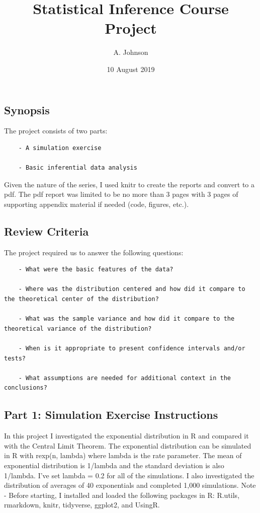 \documentclass[]{article}
\title{Statistical Inference Course Project}
\author{A. Johnson}
\date{10 August 2019}
\begin{document}
\maketitle

\subsection{Synopsis}\label{synopsis}

The project consists of two parts:

\begin{verbatim}
    - A simulation exercise
    
    - Basic inferential data analysis
\end{verbatim}

Given the nature of the series, I used knitr to create the reports and
convert to a pdf. The pdf report was limited to be no more than 3 pages
with 3 pages of supporting appendix material if needed (code, figures,
etc.).

\subsection{Review Criteria}\label{review-criteria}

The project required us to answer the following questions:

\begin{verbatim}
    - What were the basic features of the data? 
    
    - Where was the distribution centered and how did it compare to the theoretical center of the distribution?
    
    - What was the sample variance and how did it compare to the theoretical variance of the distribution?
    
    - When is it appropriate to present confidence intervals and/or tests? 
    
    - What assumptions are needed for additional context in the conclusions? 
\end{verbatim}

\subsection{Part 1: Simulation Exercise
Instructions}\label{part-1-simulation-exercise-instructions}

In this project I investigated the exponential distribution in R and
compared it with the Central Limit Theorem. The exponential distribution
can be simulated in R with rexp(n, lambda) where lambda is the rate
parameter. The mean of exponential distribution is 1/lambda and the
standard deviation is also 1/lambda. I've set lambda = 0.2 for all of
the simulations. I also investigated the distribution of averages of 40
exponentials and completed 1,000 simulations. Note - Before starting, I
installed and loaded the following packages in R: R.utils, rmarkdown,
knitr, tidyverse, ggplot2, and UsingR.
\end{document}
